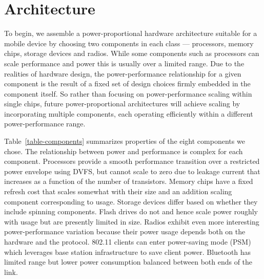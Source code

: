 \section{Architecture}
\label{section-architecture}



To begin, we assemble a power-proportional hardware architecture suitable for
a mobile device by choosing two components in each class --- processors,
memory chips, storage devices and radios. While some components such as
processors can scale performance and power this is usually over a limited
range. Due to the realities of hardware design, the power-performance
relationship for a given component is the result of a fixed set of design
choices firmly embedded in the component itself. So rather than focusing on
power-performance scaling within single chips, future power-proportional
architectures will achieve scaling by incorporating multiple components, each
operating efficiently within a different power-performance range.

Table~\ref{table-components} summarizes properties of the eight components we
chose. The relationship between power and performance is complex for each
component. Processors provide a smooth performance transition over a
restricted power envelope using DVFS, but cannot scale to zero due to leakage
current that increases as a function of the number of transistors. Memory
chips have a fixed refresh cost that scales somewhat with their size and an
addition scaling component corresponding to usage. Storage devices differ
based on whether they include spinning components. Flash drives do not and
hence scale power roughly with usage but are presently limited in size.
Radios exhibit even more interesting power-performance variation because
their power usage depends both on the hardware and the protocol. 802.11
clients can enter power-saving mode (PSM) which leverages base station
infrastructure to save client power. Bluetooth has limited range but lower
power consumption balanced between both ends of the link.

